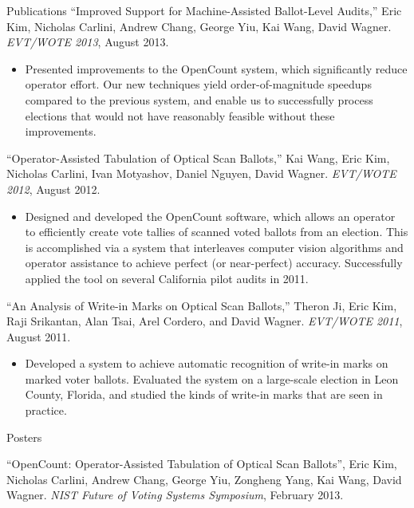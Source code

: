 \documentclass{resume}
\begin{document}
\begin{component}{Publications}
\vspace{0.5em}
``Improved Support for Machine-Assisted Ballot-Level Audits,'' Eric Kim, Nicholas Carlini, Andrew Chang, George Yiu, Kai Wang, David Wagner. \emph{EVT/WOTE 2013}, August 2013.
    \begin{itemize}
        \vspace{-0.5em}\item[] Presented improvements to the OpenCount system,
        which significantly reduce operator effort.
        Our new techniques yield order-of-magnitude speedups compared
        to the previous system, and enable us to successfully process
        elections that would not have reasonably feasible without these
        improvements.
    \end{itemize}
    
``Operator-Assisted Tabulation of Optical Scan Ballots,'' Kai Wang, Eric Kim, Nicholas Carlini, Ivan Motyashov, Daniel Nguyen, David Wagner. \emph{EVT/WOTE 2012}, August 2012.
        \begin{itemize}
        \vspace{-0.5em}\item[] Designed and developed the OpenCount software, which allows an operator
to efficiently create vote tallies of scanned voted ballots from an election. This is accomplished via a system 
that interleaves computer vision algorithms and operator assistance to achieve perfect (or near-perfect) accuracy.
Successfully applied the tool on several California pilot audits in 2011. 
        \end{itemize}

``An Analysis of Write-in Marks on Optical Scan Ballots,'' Theron Ji, Eric Kim, Raji Srikantan, Alan Tsai, Arel Cordero, and David Wagner. \emph{EVT/WOTE 2011}, August 2011.
	\begin{itemize}
	\vspace{-0.5em}\item[] Developed a system to achieve automatic recognition of write-in marks on marked voter ballots. Evaluated the system on
				       a large-scale election in Leon County, Florida, and studied the kinds of write-in marks that are seen in practice.
	\end{itemize}
\end{component}

\vspace{-0.5em}

\begin{component}{Posters}

``OpenCount: Operator-Assisted Tabulation of Optical Scan Ballots'', Eric Kim, Nicholas Carlini, Andrew Chang, George Yiu, Zongheng Yang, Kai Wang, David Wagner. \emph{NIST Future of Voting Systems Symposium}, February 2013. 
\end{component}
\end{document}
